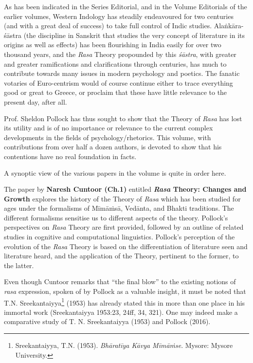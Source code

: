 \medskip

As has been indicated in the Series Editorial, and in the Volume Editorials of the earlier volumes, Western Indology has steadily endeavoured for two centuries (and with a great deal of success) to take full control of Indic studies. Alaṅkāra-śāstra (the discipline in Sanskrit that studies the very concept of literature in its origins as well as effects) has been flourishing in India easily for over two thousand years, and the \textsl{Rasa} Theory propounded by this \textsl{śāstra}, with greater and greater ramifications and clarifications through centuries, has much to contribute towards many issues in modern psychology and poetics. The fanatic votaries of Euro-centrism would of course continue either to trace everything good or great to Greece, or proclaim that these have little relevance to the present day, after all.

Prof. Sheldon Pollock has thus sought to show that the Theory of \textsl{Rasa} has lost its utility and is of no importance or relevance to the current complex developments in the fields of psychology/rhetorics. This volume, with contributions from over half a dozen authors, is devoted to show that his contentions have no real foundation in facts.

A synoptic view of the various papers in the volume is quite in order here.

The paper by {\bf Naresh Cuntoor (Ch.1)} entitled {\bf\textsl{Rasa} Theory: Changes and Growth} explores the history of the Theory of \textsl{Rasa} which has been studied for ages under the formalisms of Mīmāṁsā, Vedānta, and Bhakti traditions. The different formalisms sensitise us to different aspects of the theory. Pollock’s perspectives on \textsl{Rasa} Theory are first provided, followed by an outline of related studies in cognitive and computational linguistics. Pollock’s perception of the evolution of the \textsl{Rasa} Theory is based on the differentiation of literature seen and literature heard, and the application of the Theory, pertinent to the former, to the latter.

Even though Cuntoor remarks that “the final blow” to the existing notions of \textsl{rasa} expression, spoken of by Pollock as a valuable insight, it must be noted that T.N. Sreekantaiyya\footnote[1]{Sreekantaiyya, T.N. (1953). \textsl{Bhāratīya Kāvya Mīmāṁse}. Mysore: Mysore University.} (1953) has already stated this in more than one place in his immortal work (Sreekantaiyya 1953:23, 24ff, 34, 321). One may indeed make a comparative study of T. N. Sreekantaiyya (1953) and Pollock (2016).

